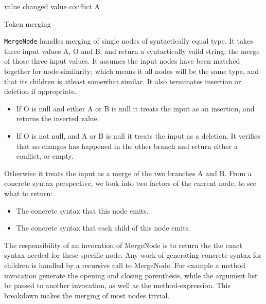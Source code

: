 \documentclass[11pt]{article}
\begin{document}
\begin{algorithm}
\begin{algorithmic}
        \State \Return value
    \EndIf
        \State \Return changed value
    \EndIf
            \State \Return conflict
	    \EndIf
        \State \Return A
    \EndIf
\EndFunction
\end{algorithmic}
  \caption{Token merging}
  \label{MergeToken}
\end{algorithm}


\texttt{MergeNode} handles merging of single nodes of syntactically equal type. It takes three input values A, O and B, and return a syntactically valid string; the merge of those three input values. It assumes the input nodes have been matched together for node-similarity; which means it all nodes will be the same type, and that its children is atleast somewhat similar. It also terminates insertion or deletion if appropriate. 

\begin{itemize}
   \item If O is null and either A or B is null it treats the input as an insertion, and returns the inserted value.
   \item If O is not null, and A or B is null it treats the input as a deletion. It verifies that no changes has happened in the other branch and return either a conflict, or empty.
\end{itemize}

Otherwise it treats the input as a merge of the two branches A and B. From a concrete syntax perspective, we look into two factors of the current node, to see what to return:

\begin{itemize}
   \item The concrete syntax that this node emits.
   \item The concrete syntax that each child of this node emits.
\end{itemize}

The responsibility of an invocation of MergeNode is to return the the exact syntax needed for these specific node. Any work of generating concrete syntax for children is handled by a recursive call to MergeNode. For example a method invocation generate the opening and closing parenthesis, while the argument list be passed to another invocation, as well as the method-expression. This breakdown makes the merging of most nodes trivial.
\end{document}
